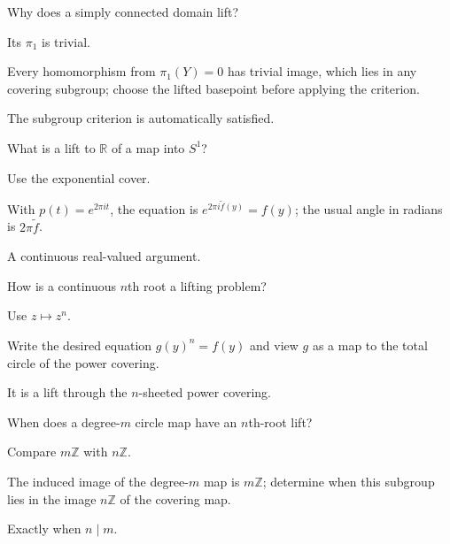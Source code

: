 \begin{exercise}\label{exr:viii11-15}
Why does a simply connected domain lift?
\end{exercise}
\begin{hint}
Its \(\pi_1\) is trivial.

Every homomorphism from \(\pi_1(Y)=0\) has trivial image, which lies in any covering subgroup; choose the lifted basepoint before applying the criterion.
\end{hint}
\begin{solution}
The subgroup criterion is automatically satisfied.
\end{solution}

\begin{exercise}\label{exr:viii11-16}
What is a lift to \(\mathbb R\) of a map into \(S^1\)?
\end{exercise}
\begin{hint}
Use the exponential cover.

With \(p(t)=e^{2\pi it}\), the equation is \(e^{2\pi i\widetilde f(y)}=f(y)\); the usual angle in radians is \(2\pi\widetilde f\).
\end{hint}
\begin{solution}
A continuous real-valued argument.
\end{solution}

\begin{exercise}\label{exr:viii11-17}
How is a continuous \(n\)th root a lifting problem?
\end{exercise}
\begin{hint}
Use \(z\mapsto z^n\).

Write the desired equation \(g(y)^n=f(y)\) and view \(g\) as a map to the total circle of the power covering.
\end{hint}
\begin{solution}
It is a lift through the \(n\)-sheeted power covering.
\end{solution}

\begin{exercise}\label{exr:viii11-18}
When does a degree-\(m\) circle map have an \(n\)th-root lift?
\end{exercise}
\begin{hint}
Compare \(m\mathbb Z\) with \(n\mathbb Z\).

The induced image of the degree-\(m\) map is \(m\mathbb Z\); determine when this subgroup lies in the image \(n\mathbb Z\) of the covering map.
\end{hint}
\begin{solution}
Exactly when \(n\mid m\).
\end{solution}

